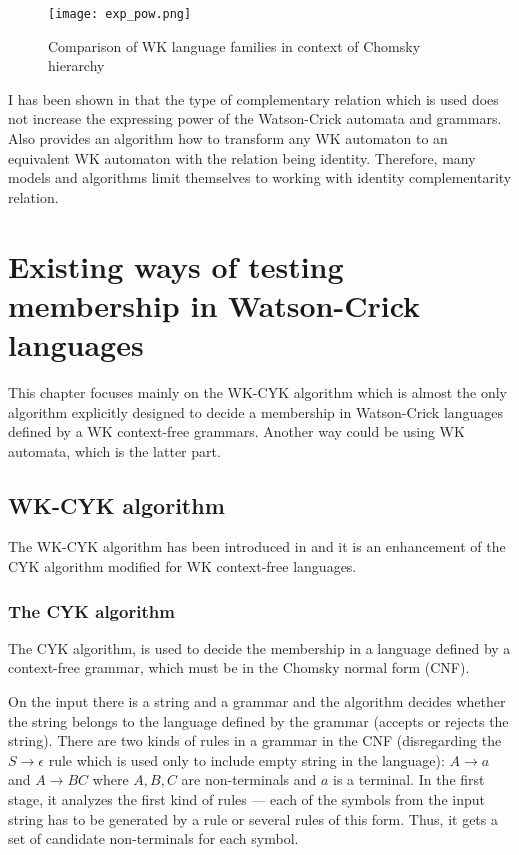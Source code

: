 \begin{figure}[ht]
  \texttt{[image: exp\_pow.png]}
  \centering
  \label{fig:expr-power}
  \caption{Comparison of WK language families in context of Chomsky hierarchy}
\end{figure}

I has been shown in \cite{COMPL_REL} that the type of complementary relation which is used does not increase the expressing power of the Watson-Crick automata and grammars. Also \cite{SURVEY} provides an algorithm how to transform any WK automaton to an equivalent WK automaton with the relation being identity. Therefore, many models and algorithms limit themselves to working with identity complementarity relation.

\chapter{Existing ways of testing membership in Watson-Crick languages} \label{chapter:WK_CYK}

This chapter focuses mainly on the WK-CYK algorithm which is almost the only algorithm explicitly designed to decide a membership in Watson-Crick languages defined by a WK context-free grammars. Another way could be using WK automata, which is the latter part.

\section{WK-CYK algorithm}
The WK-CYK algorithm has been introduced in \cite{WK_CYK} and it is an enhancement of the CYK algorithm modified for WK context-free languages.

\subsection{The CYK algorithm}
The CYK algorithm, is used to decide the membership in a language defined by a context-free grammar, which must be in the Chomsky normal form (CNF).

On the input there is a string and a grammar and the algorithm decides whether the string belongs to the language defined by the grammar (accepts or rejects the string). There are two kinds of rules in a grammar in the CNF (disregarding the $S \rightarrow \epsilon$ rule which is used only to include empty string in the language): $A \rightarrow a$ and $A \rightarrow BC$ where $A, B, C$ are non-terminals and $a$ is a terminal. In the first stage, it analyzes the first kind of rules --- each of the symbols from the input string has to be generated by a rule or several rules of this form. Thus, it gets a set of candidate non-terminals for each symbol.

